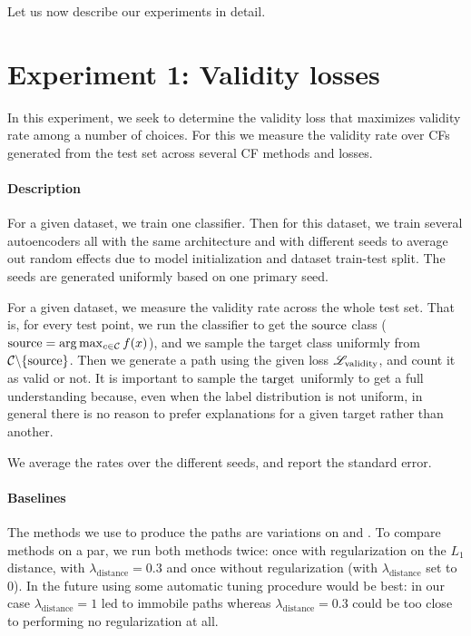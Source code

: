 \documentclass[../main.tex]{subfiles}
\begin{document}
Let us now describe our experiments in detail.

\section{Experiment 1: Validity losses}

In this experiment, we seek to determine the validity loss that maximizes validity rate among a number of choices.
For this we measure the validity rate over CFs generated from the test set across several CF methods and losses.

\paragraph{Description}
\label{validity_losses/description}

For a given dataset, we train one classifier.
Then for this dataset, we train several autoencoders all with the same architecture and with different seeds to average out random effects due to model initialization and dataset train-test split.
The seeds are generated uniformly based on one primary seed.

For a given dataset, we measure the validity rate across the whole test set.
That is, for every test point, we run the classifier to get the $\mathrm{source}$ class ($\mathrm{source} = \arg\max_{c \in \mathcal{C}} f(x)$), and we sample the target class uniformly from $\mathcal{C} \backslash \{\mathrm{source}\}$.
Then we generate a path using the given loss $\mathscr{L}_\text{validity}$, and count it as valid or not.
It is important to sample the $\mathrm{target}$ uniformly to get a full understanding because, even when the label distribution is not uniform, in general there is no reason to prefer explanations for a given target rather than another.

We average the rates over the different seeds, and report the standard error.

\paragraph{Baselines}

The methods we use to produce the paths are variations on \ls{} and \revise{}.
To compare methods on a par, we run both methods twice: once with regularization on the $L_1$ distance, with $\lambda_\text{distance} = 0.3$ and once without regularization (with $\lambda_\text{distance}$ set to 0).
In the future using some automatic tuning procedure would be best: in our case $\lambda_\text{distance} = 1$ led to immobile paths whereas $\lambda_\text{distance} = 0.3$ could be too close to performing no regularization at all.
\end{document}
